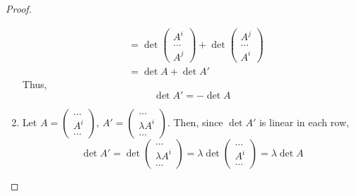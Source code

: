 \documentclass[letterpaper,12pt]{article}
\begin{document}
\begin{proof}
\begin{enumerate}
\begin{align*}
        & = \det{\begin{pmatrix} A^i \\ \dots \\ A^j \end{pmatrix}} + \det{\begin{pmatrix} A^j \\ \dots \\ A^i \end{pmatrix}} \\
        & = \det{A} + \det{A'}
    \end{align*}
    Thus,
    \begin{equation*}
        \det{A'} = -\det{A}
    \end{equation*}
    
    \item Let $A = \begin{pmatrix} \dots \\ A^i \\ \dots \end{pmatrix}$, $A' = \begin{pmatrix} \dots \\ \lambda A^i \\ \dots \end{pmatrix}$. Then, since $\det{A'}$ is linear in each row,
    \begin{equation*}
        \det{A'} = \det{\begin{pmatrix} \dots \\ \lambda A^i \\ \dots \end{pmatrix}} = \lambda \det{\begin{pmatrix} \dots \\ A^i \\ \dots \end{pmatrix}} = \lambda \det{A}
    \end{equation*}
    

\end{enumerate}
\end{proof}
\end{document}

